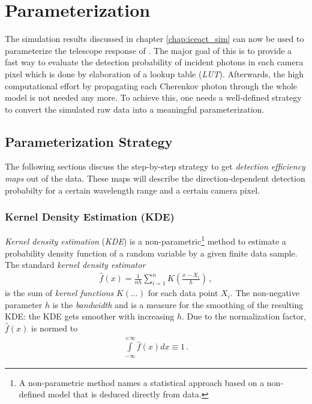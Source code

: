 \chapter{\iceact Parameterization}

The simulation results discussed in chapter \ref{chap:iceact_sim} can now be used to parameterize the telescope response of \iceact. The major goal of this is to provide a fast way to evaluate the detection probability of incident photons in each camera pixel which is done by elaboration of a lookup table (\textit{LUT}). Afterwards, the high computational effort by propagating each Cherenkov photon through the whole \geant model is not needed any more. To achieve this, one needs a well-defined strategy to convert the simulated raw data into a meaningful parameterization. 

\section{Parameterization Strategy}\label{sec:param:strategy}

The following sections discuss the step-by-step strategy to get \textit{detection efficiency maps} out of the \geant data. These maps will describe the direction-dependent detection probabilty for a certain wavelength range and a certain camera pixel.

\subsection{Kernel Density Estimation (KDE)}

\textit{Kernel density estimation} (\textit{KDE}) is a non-parametric\footnote{A non-parametric method names a statistical approach based on a non-defined model that is deduced directly from data.} method to estimate a probability density function of a random variable by a given finite data sample. The standard \textit{kernel density estimator}
\begin{align}
	\hat{f}(x)=\frac{1}{nh}\sum_{i=1}^{n}K\left(\frac{x-X_i}{h}\right)\,,
	\label{eq:kde}
\end{align}
is the sum of \textit{kernel functions} $K(\dots)$ for each data point $X_i$. The non-negative parameter $h$ is the \textit{bandwidth} and is a measure for the smoothing of the resulting KDE: the KDE gets smoother with increasing $h$. Due to the normalization factor, $\hat{f}(x)$ is normed to
\begin{align}
	\int\limits_{-\infty}^{+\infty}\hat{f}(x)dx \equiv 1\,.
	\label{kde:norm}
\end{align}

